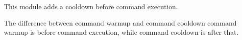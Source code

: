 
This module adds a cooldown before command execution.

\begin{note}{The difference between command warmup and command cooldown}
    command warmup is before command execution, while command cooldown is after that.
\end{note}
